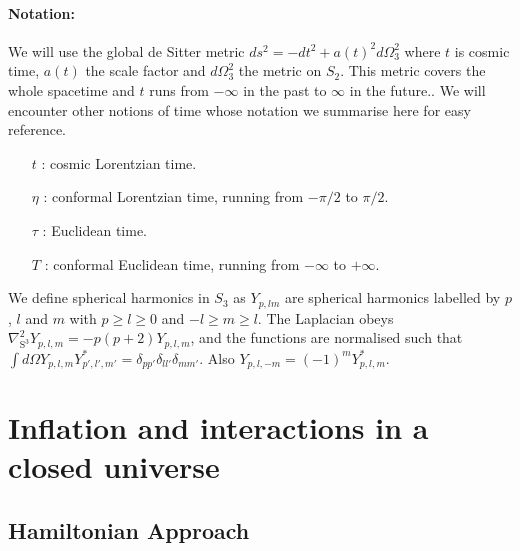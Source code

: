 \documentclass[a4paper,11pt]{article}
\numberwithin{equation}{section}
\numberwithin{equation}{section}
\begin{document}
\paragraph{\textbf{Notation:}}
We will use the global de Sitter metric $ds^2=-dt^2+a(t)^2d\Omega_3^2$ where $t$ is cosmic time, $a(t)$ the scale factor and $d\Omega_3^2$ the metric on $S_2$. This metric covers the whole spacetime and $t$ runs from $-\infty$ in the past to $\infty$ in the future.. We will encounter other notions of time whose notation we summarise here  for easy reference.
\begin{itemize}
\item[$t$]: cosmic Lorentzian time.
\item[$\eta$]: conformal Lorentzian time, running from $-\pi/2$ to $\pi/2$.
\item[$\tau$]: Euclidean time.
\item[$T$]: conformal Euclidean time, running from $-\infty$ to $+\infty$.
\end{itemize}
We define spherical harmonics in $S_3$ as $Y_{p, l m} $ are spherical harmonics labelled by $p$, $l$ and $m$ with $p \geq l \geq 0$ and $-l \geq m \geq l$. 
The Laplacian obeys $\nabla^2_{\mathrm{S}^3}Y_{p, l, m}=-p(p+2)Y_{p, l, m}$, and the functions are normalised such that $\int d\Omega Y_{p, l, m}Y^*_{p', l', m'}=\delta_{pp'}\delta_{ll'}\delta_{mm'}$. Also  $Y_{p, l, -m} = (-1)^{m}Y^*_{p,  l, m}$.

\section{Inflation and interactions in a closed universe}
\label{sec:Formalism}

\subsection{Hamiltonian Approach}
\end{document}
